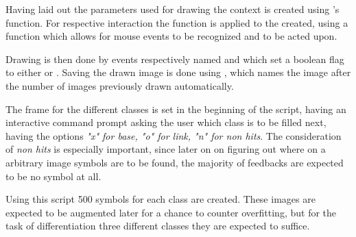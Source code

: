 Having laid out the parameters used for drawing the context is created using
's  function. For respective interaction the  function is applied to the  created, using a  function which allows for mouse events to be recognized and to be acted upon.

Drawing is then done by events respectively named  and  which set a boolean  flag to either  or .
Saving the drawn image is done using , which names the image after the number of images previously drawn automatically.

The frame for the different classes is set in the beginning of the script, having an interactive command prompt asking the user which class is to be filled next, having the options \textit{"x" for base, "o" for link, "n" for non hits}. The consideration of \textit{non hits} is especially important, since later on on figuring out where on a arbitrary image symbols are to be found, the majority of feedbacks are expected to be no symbol at all.

Using this script 500 symbols for each class are created. These images are expected to be augmented later for a chance to counter overfitting, but for the task of differentiation three different classes they are expected to suffice.

